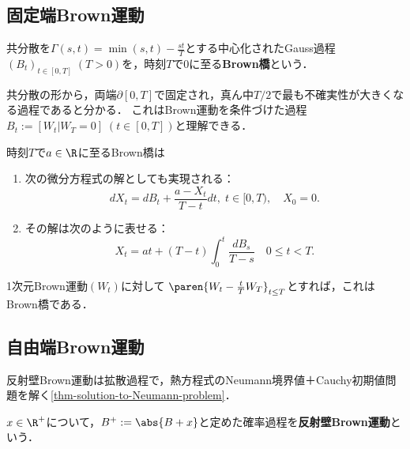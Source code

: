 \documentclass[uplatex,dvipdfmx]{jsreport}
\begin{document}
\subsection{固定端Brown運動}

\begin{definition}
    共分散を$\Gamma(s,t)=\min(s,t)-\frac{st}{T}$とする中心化されたGauss過程$(B_t)_{t\in[0,T]}\;(T>0)$を，時刻$T$で$0$に至る\textbf{Brown橋}という．
\end{definition}
\begin{remarks}
    共分散の形から，両端$\partial[0,T]$で固定され，真ん中$T/2$で最も不確実性が大きくなる過程であると分かる．
    これはBrown運動を条件づけた過程$B_t:=[W_t|W_T=0]\;(t\in[0,T])$と理解できる．
\end{remarks}
\begin{theorem}
    時刻$T$で$a\in\R$に至るBrown橋は
    \begin{enumerate}
        \item 次の微分方程式の解としても実現される：
        \[dX_t=dB_t+\frac{a-X_t}{T-t}dt,\;t\in[0,T),\quad X_0=0.\]
        \item その解は次のように表せる：
        \[X_t=at+(T-t)\int^t_0\frac{dB_s}{T-s}\quad 0\le t<T.\]
    \end{enumerate}
\end{theorem}

\begin{construction}
    1次元Brown運動$(W_t)$に対して
    $\paren{W_t-\frac{t}{T}W_T}_{t\le T}$とすれば，これはBrown橋である．
\end{construction}

\subsection{自由端Brown運動}

\begin{tcolorbox}[colframe=ForestGreen, colback=ForestGreen!10!white,breakable,colbacktitle=ForestGreen!40!white,coltitle=black,fonttitle=\bfseries\sffamily,
title=]
    反射壁Brown運動は拡散過程で，熱方程式のNeumann境界値＋Cauchy初期値問題を解く\ref{thm-solution-to-Neumann-problem}．
\end{tcolorbox}

\begin{definition}
    $x\in\R^+$について，$B^+:=\abs{B+x}$と定めた確率過程を\textbf{反射壁Brown運動}という．
\end{definition}
\end{document}
